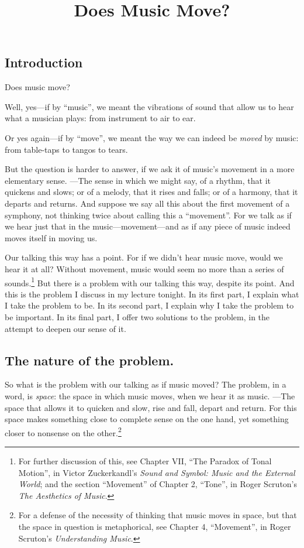 \documentclass[12pt]{memoir}
\title{Does Music Move?}
\author{}
\date{}
\begin{document}
\maketitle

\subsection{Introduction}

Does music move?

Well, yes---if by ``music'', we meant the
vibrations of sound that allow us to hear what a
musician plays: from instrument to air to ear.

Or yes again---if by ``move'', we meant the way
we can indeed be \emph{moved} by music: from
table-taps to tangos to tears.

But the question is harder to answer, if we ask it
of music's movement in a more elementary sense.
---The sense in which we might say, of a rhythm,
that it quickens and slows; or of a melody,
that it rises and falls; or of a harmony, that
it departs and returns. And suppose we say all
this about the first movement of a symphony, not
thinking twice about calling this a ``movement''.
For we talk as if we hear just that in the
music---movement---and as if any piece of music
indeed moves itself in moving us.

Our talking this way has a point. For if we didn't
hear music move, would we hear it at all? Without
movement, music would seem no more than a series
of sounds.\footnote{For further discussion of
this, see Chapter VII, ``The Paradox of Tonal
Motion'', in Victor Zuckerkandl's \emph{Sound and
Symbol: Music and the External World}; and the
section ``Movement'' of Chapter 2, ``Tone'', in
Roger Scruton's \emph{The Aesthetics of Music}.}
But there is a problem with our talking this way,
despite its point. And this is the problem I
discuss in my lecture tonight. In its first part,
I explain what I take the problem to be. In its
second part, I explain why I take the problem
to be important. In its final part, I offer two
solutions to the problem, in the attempt to deepen
our sense of it.

\subsection{The nature of the problem.}

So what is the problem with our talking as
if music moved? The problem, in a word, is
\emph{space}: the space in which music moves, when
we hear it as music. ---The space that allows it
to quicken and slow, rise and fall, depart and
return. For this space makes something close to
complete sense on the one hand, yet something
closer to nonsense on the other.\footnote{For a
defense of the necessity of thinking that music
moves in space, but that the space in question
is metaphorical, see Chapter 4, ``Movement'', in
Roger Scruton's \emph{Understanding Music}.}
\end{document}
